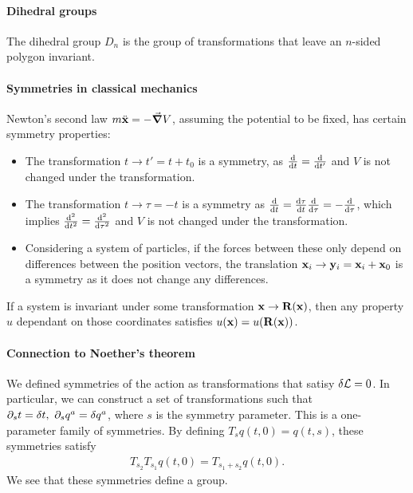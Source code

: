 \paragraph{Dihedral groups}
The dihedral group $D_{n}$ is the group of transformations that leave an $n$-sided polygon invariant.

\paragraph{Symmetries in classical mechanics}

Newton's second law $m\ddot{\vb{x}} = -\grad{V}$, assuming the potential to be fixed, has certain symmetry properties:
\begin{itemize}
	\item The transformation $t\to t' = t + t_{0}$ is a symmetry, as $\dv{t} = \dv{t'}$ and $V$ is not changed under the transformation.
	\item The transformation $t\to\tau = -t$ is a symmetry as $\dv{t} = \dv{\tau}{t}\dv{\tau} = -\dv{\tau}$, which implies $\dv[2]{t} = \dv[2]{\tau}$ and $V$ is not changed under the transformation.
	\item Considering a system of particles, if the forces between these only depend on differences between the position vectors, the translation $\vb{x}_{i}\to\vb{y}_{i} = \vb{x}_{i} + \vb{x}_{0}$ is a symmetry as it does not change any differences.
\end{itemize}

If a system is invariant under some transformation $\vb{x}\to\vb{R}(\vb{x})$, then any property $u$ dependant on those coordinates satisfies $u(\vb{x}) = u(\vb{R}(\vb{x}))$.

\paragraph{Connection to Noether's theorem}
We defined symmetries of the action as transformations that satisy $\delta \mathcal{L} = 0$. In particular, we can construct a set of transformations such that $\partial_{s}t = \delta t,\ \partial_{s}q^{a} = \delta q^{a}$, where $s$ is the symmetry parameter. This is a one-parameter family of symmetries. By defining $T_{s}q(t, 0) = q(t, s)$, these symmetries satisfy
\begin{align*}
	T_{s_{2}}T_{s_{1}}q(t, 0) = T_{s_{1} + s_{2}}q(t, 0).
\end{align*}
We see that these symmetries define a group.


